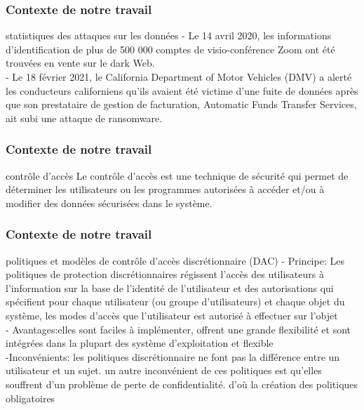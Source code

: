\documentclass[10pt]{beamer}
\begin{document}
\begin{frame}
 \frametitle{Contexte de notre travail}
  \begin{block}{statistiques des attaques sur les données}
    - Le 14 avril 2020, les informations d'identification de plus de 500 000 comptes de visio-conférence Zoom ont été trouvées en vente sur le dark Web.  \\
    - Le 18 février 2021, le California Department of Motor Vehicles (DMV) a alerté les conducteurs californiens qu'ils avaient été victime d'une fuite de données après que son prestataire de gestion de facturation, Automatic Funds Transfer Services, ait subi une attaque de ransomware.
  \end{block}
\end{frame}

\begin{frame}
 \frametitle{Contexte de notre travail}
  \begin{block}{ contrôle d'accès}
    Le contrôle d'accès est une technique de sécurité qui  permet de déterminer les utilisateurs ou les programmes autorisées à accéder et/ou à modifier des données sécurisées dans le système. 
  \end{block}
\end{frame}

\begin{frame}
 \frametitle{Contexte de notre travail}
  \begin{block}{ politiques et modèles de contrôle d'accès discrétionnaire (DAC)}
    - Principe: Les politiques de protection discrétionnaires régissent l'accès des utilisateurs à l'information sur la base de l'identité de l'utilisateur et des autorisations qui spécifient pour chaque utilisateur (ou groupe d'utilisateurs) et chaque objet du système, les modes d'accès que l'utilisateur est autorisé à effectuer sur l'objet  \\
    - Avantages:elles sont faciles à implémenter, offrent une grande flexibilité et sont intégrées dans la plupart des système d'exploitation et flexible\\
    -Inconvénients: les politiques discrétionnaire ne font pas la différence entre un utilisateur et un sujet. un autre inconvénient de ces politiques est qu'elles souffrent d'un problème de perte de confidentialité. d'où la création des politiques obligatoires
  \end{block}
\end{frame}
\end{document}
